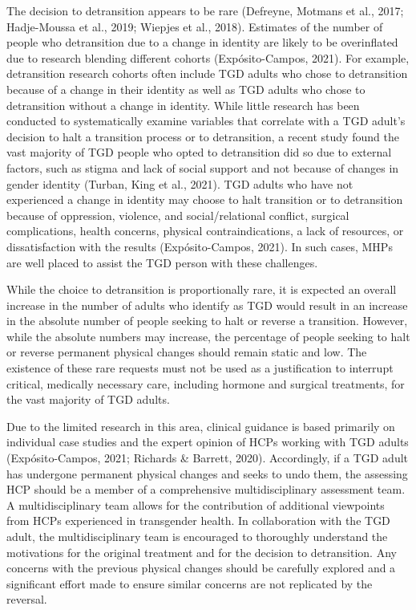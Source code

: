 \documentclass[
]{book}
\begin{document}
The decision to detransition appears to be
rare (Defreyne, Motmans et al., 2017;
Hadje-Moussa et al., 2019; Wiepjes et al., 2018).
Estimates of the number of people who detransition due to a change in identity are likely to
be overinflated due to research blending different cohorts (Expósito-Campos, 2021). For example, detransition research cohorts often include
TGD adults who chose to detransition because
of a change in their identity as well as TGD
adults who chose to detransition without a
change in identity. While little research has been
conducted to systematically examine variables
that correlate with a TGD adult's decision to
halt a transition process or to detransition, a
recent study found the vast majority of TGD
people who opted to detransition did so due to
external factors, such as stigma and lack of
social support and not because of changes in
gender identity (Turban, King et al., 2021). TGD
adults who have not experienced a change in
identity may choose to halt transition or to
detransition because of oppression, violence, and
social/relational conflict, surgical complications,
health concerns, physical contraindications, a
lack of resources, or dissatisfaction with the
results (Expósito-Campos, 2021). In such cases,
MHPs are well placed to assist the TGD person
with these challenges.

While the choice to detransition is proportionally rare, it is expected an overall increase in the
number of adults who identify as TGD would
result in an increase in the absolute number of
people seeking to halt or reverse a transition.
However, while the absolute numbers may
increase, the percentage of people seeking to halt
or reverse permanent physical changes should
remain static and low. The existence of these rare
requests must not be used as a justification to
interrupt critical, medically necessary care, including hormone and surgical treatments, for the vast
majority of TGD adults.

Due to the limited research in this area, clinical guidance is based primarily on individual
case studies and the expert opinion of HCPs
working with TGD adults (Expósito-Campos,
2021; Richards \& Barrett, 2020). Accordingly, if
a TGD adult has undergone permanent physical
changes and seeks to undo them, the assessing
HCP should be a member of a comprehensive
multidisciplinary assessment team. A multidisciplinary team allows for the contribution of additional viewpoints from HCPs experienced in
transgender health. In collaboration with the
TGD adult, the multidisciplinary team is encouraged to thoroughly understand the motivations
for the original treatment and for the decision
to detransition. Any concerns with the previous
physical changes should be carefully explored and
a significant effort made to ensure similar concerns are not replicated by the reversal.
\end{document}
